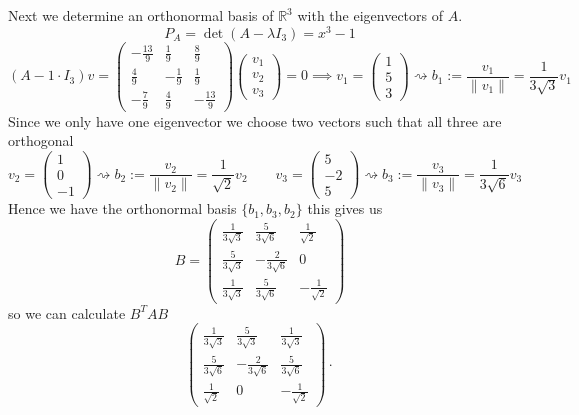 \begin{example}
   Next we determine an orthonormal basis of \(\mathbb{R}^3\) with the eigenvectors of \(A\).
   \[P_A = \det(A - \lambda I_3) = x^3 - 1\]
   \[(A - 1 \cdot I_3)v =
      \begin{pmatrix}
         -\frac{13}{9} & \frac{1}{9} & \frac{8}{9}\\
         \frac{4}{9} & -\frac{1}{9} & \frac{1}{9}\\
         -\frac{7}{9} & \frac{4}{9} & -\frac{13}{9}
         \end{pmatrix} \begin{pmatrix}v_1\\v_2\\v_3\end{pmatrix} = 0 \implies v_1 = \begin{pmatrix}1\\5\\3\end{pmatrix} \rightsquigarrow b_1 := \frac{v_1}{\|v_1\|} = \frac{1}{3\sqrt{3}}v_1
   \]
   Since we only have one eigenvector we choose two vectors such that all three are orthogonal
   \[v_2 = \begin{pmatrix}1\\0\\-1\end{pmatrix} \rightsquigarrow b_2 := \frac{v_2}{\|v_2\|} = \frac{1}{\sqrt{2}}v_2 \qquad v_3 = \begin{pmatrix}5\\-2\\5\end{pmatrix} \rightsquigarrow b_3 := \frac{v_3}{\|v_3\|} = \frac{1}{3\sqrt{6}}v_3\]
   Hence we have the orthonormal basis \(\{b_1, b_3, b_2\}\) this gives us
   \[B = \begin{pmatrix}
         \frac{1}{3\sqrt{3}} & \frac{5}{3\sqrt{6}} & \frac{1}{\sqrt{2}}\\
         \frac{5}{3\sqrt{3}} & -\frac{2}{3\sqrt{6}} & 0\\
         \frac{1}{3\sqrt{3}} & \frac{5}{3\sqrt{6}} & -\frac{1}{\sqrt{2}}
   \end{pmatrix}\]
   so we can calculate \(B^TAB\)
   \[
      \begin{pmatrix}
         \frac{1}{3\sqrt{3}} & \frac{5}{3\sqrt{3}}  & \frac{1}{3\sqrt{3}}\\
         \frac{5}{3\sqrt{6}} & -\frac{2}{3\sqrt{6}} & \frac{5}{3\sqrt{6}}\\
         \frac{1}{\sqrt{2}}  & 0                    & -\frac{1}{\sqrt{2}}
      \end{pmatrix} \cdot
\]
\end{example}
